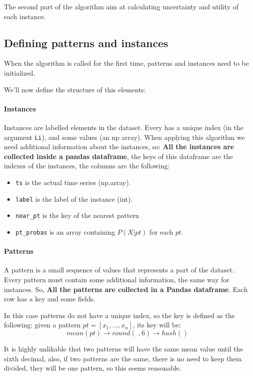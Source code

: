 The second part of the algorithm aim at calculating uncertainty and utility of each instance.

\subsection{Defining patterns and instances}
When the algorithm is called for the first time, patterns and instances need to be initialized.

We'll now define the structure of this elements:

\paragraph{Instances}
Instances are labelled elements in the dataset. Every has a unique index (in the argument \texttt{Li}), and some 
values (an np array). When applying this algorithm we need additional information about the instances, so:
\textbf{All the instances are collected inside a pandas dataframe}, the keys of this dataframe are the indexes of 
the instances, the columns are the following:

\begin{itemize}
    \item \texttt{ts} is the actual time series (np.array).
    \item \texttt{label} is the label of the instance (int).
    \item \texttt{near\_pt} is the key of the nearest pattern
    \item \texttt{pt\_probas} is an array containing $P(X | pt)$ for each $pt$.
\end{itemize}

\paragraph{Patterns}
A pattern is a small sequence of values that represents a part of the dataset. Every pattern must contain 
some additional information, the same way for instances. So, \textbf{All the patterns are collected in a 
Pandas dataframe}. Each row has a key and some fields.

In this case patterns do not have a unique index, so the key is defined as the following: given a pattern
$pt = [x_1, \dots, x_n]$, its key will be:
$$
    mean(pt) \longrightarrow round(\,\, ,6) \longrightarrow hash()
$$

It is highly unlikable that two patterns will have the same mean value until the sixth decimal, also, 
if two patterns are the same, there is no need to keep them divided, they will be one pattern, so 
this seems reasonable.

